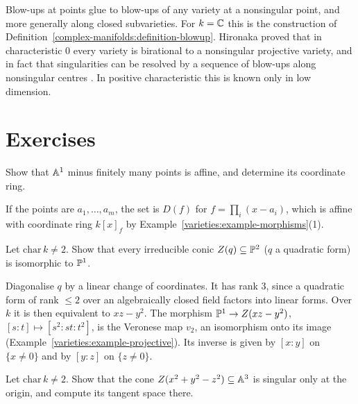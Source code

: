 \begin{remark}\label{varieties:remark-resolution}
Blow-ups at points glue to blow-ups of any variety at a nonsingular point, and more generally along closed subvarieties. For $k = \mathbb{C}$ this
is the construction of Definition~\ref{complex-manifolds:definition-blowup}. Hironaka proved that in characteristic $0$ every variety is
birational to a nonsingular projective variety, and in fact that singularities can be resolved by a sequence of blow-ups along nonsingular
centres \cite{hironaka-1964}. In positive characteristic this is known only in low dimension.
\end{remark}

\section{Exercises}\label{varieties:section-exercises}

\begin{exercise}\label{varieties:exercise-affine-line-punctured}
Show that $\mathbb{A}^1$ minus finitely many points is affine, and determine its coordinate ring.
\end{exercise}

\begin{solution}
If the points are $a_1, \ldots, a_m$, the set is $D(f)$ for $f = \prod_i(x - a_i)$, which is affine with coordinate ring $k[x]_f$ by
Example~\ref{varieties:example-morphisms}(1).
\end{solution}

\begin{exercise}\label{varieties:exercise-conics}
Let $\mathrm{char}\,k \neq 2$. Show that every irreducible conic $Z(q) \subseteq \mathbb{P}^2$ ($q$ a quadratic form) is isomorphic to $\mathbb{P}^1$.
\end{exercise}

\begin{solution}
Diagonalise $q$ by a linear change of coordinates. It has rank $3$, since a quadratic form of rank $\leq 2$ over an algebraically closed field
factors into linear forms. Over $k$ it is then equivalent to $xz - y^2$. The morphism $\mathbb{P}^1 \to Z(xz - y^2)$, $[s : t] \mapsto [s^2 : st : t^2]$, is
the Veronese map $v_2$, an isomorphism onto its image (Example~\ref{varieties:example-projective}). Its inverse is given by $[x : y] $ on
$\{x \neq 0\}$ and by $[y : z]$ on $\{z \neq 0\}$.
\end{solution}

\begin{exercise}\label{varieties:exercise-cone-singular}
Let $\mathrm{char}\,k \neq 2$. Show that the cone $Z(x^2 + y^2 - z^2) \subseteq \mathbb{A}^3$ is singular only at the origin, and compute its tangent space
there.
\end{exercise}

